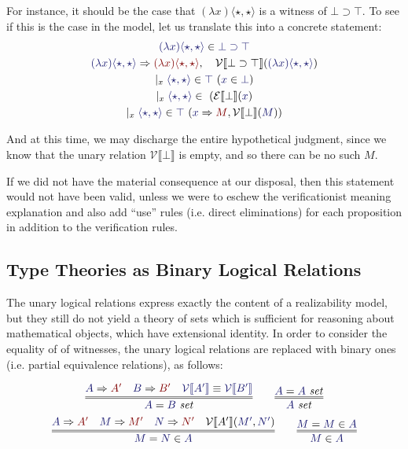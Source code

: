 \documentclass[11pt]{amsart}
\theoremstyle{definition}
\theoremstyle{remark}
\numberwithin{equation}{section}
\def\InputModeColorName{MidnightBlue}
\def\OutputModeColorName{Maroon}
\newcommand\InputMode[1]{{\color{\InputModeColorName}{#1}}}
\newcommand\OutputMode[1]{{\color{\OutputModeColorName}{#1}}}
\newcommand\HypJ[2]{#1\ (#2)}
\newcommand\GenJ[2]{\vert_{#1}\; #2}
\newcommand\IsSet[1]{\InputMode{#1}\ \mathit{set}}
\newcommand\EqSet[2]{\InputMode{#1}=\InputMode{#2}\ \mathit{set}}
\newcommand\Member[2]{\InputMode{#1}\in \InputMode{#2}}
\newcommand\EqMember[3]{\InputMode{#1}=\InputMode{#2}\in \InputMode{#3}}
\newcommand\Eval[2]{\InputMode{#1}\Rightarrow \OutputMode{#2}}
\newcommand\SEM[1]{\llbracket#1 \rrbracket}
\newcommand\VAL[1]{\mathcal{V}\SEM{#1}}
\newcommand\EXP[1]{\mathcal{E}\SEM{#1}}
\newcommand\True{\top}
\newcommand\False{\bot}
\newcommand\Imp[2]{#1\supset #2}
\newcommand\It{\star}
\newcommand\Lam[2]{(\lambda #1) #2}
\newcommand\Pair[2]{\langle #1, #2 \rangle}
\begin{document}
For instance, it should be the case that $\Lam{x}{\Pair{\It}{\It}}$ is a witness
of $\Imp{\False}{\True}$. To see if this is the case in the
model, let us translate this into a concrete statement:
\begin{gather}
  \Member{\Lam{x}{\Pair{\It}{\It}}}{\Imp{\False}{\True}}\\
  \Eval{\Lam{x}{\Pair{\It}{\It}}}{\Lam{x}{\Pair{\It}{\It}}}, \quad
    \VAL{\Imp{\False}{\True}}(\InputMode{\Lam{x}{\Pair{\It}{\It}}})\\
  \GenJ{x}{
    \HypJ{\Member{\Pair{\It}{\It}}{\True}}{\Member{x}{\False}}
  }\\
  \GenJ{x}{
    \HypJ{\Member{\Pair{\It}{\It}}}{\EXP{\False}(\InputMode{x}}
  }\\
  \GenJ{x}{
    \HypJ{\Member{\Pair{\It}{\It}}{\True}}{\Eval{x}{M}, \VAL{\False}(\InputMode{M})}
  }
\end{gather}

And at this time, we may discharge the entire hypothetical judgment, since we
know that the unary relation $\VAL{\False}$ is empty, and so there can be no
such $M$.

If we did not have the material consequence at our disposal, then this statement
would not have been valid, unless we were to eschew the verificationist meaning
explanation and also add ``use'' rules (i.e. direct eliminations) for each
proposition in addition to the verification rules.

\subsection{Type Theories as Binary Logical Relations}

The unary logical relations express exactly the content of a realizability
model, but they still do not yield a theory of sets which is sufficient for
reasoning about mathematical objects, which have extensional identity. In order
to consider the equality of of witnesses, the unary logical relations are
replaced with binary ones (i.e. partial equivalence relations), as follows:

\begin{gather*}
  \infer={
    \EqSet{A}{B}
  }{
    \Eval{A}{A'} &
    \Eval{B}{B'} &
    \InputMode{\VAL{A'}}\equiv\InputMode{\VAL{B'}}
  }\qquad
  \infer={
    \IsSet{A}
  }{
   \EqSet{A}{A}
  }\\
  \infer={
    \EqMember{M}{N}{A}
  }{
    \Eval{A}{A'} &
    \Eval{M}{M'} &
    \Eval{N}{N'} &
    \VAL{A'}(\InputMode{M'}, \InputMode{N'})
  }\qquad
  \infer={
    \Member{M}{A}
  }{
    \EqMember{M}{M}{A}
  }
\end{gather*}
\end{document}

